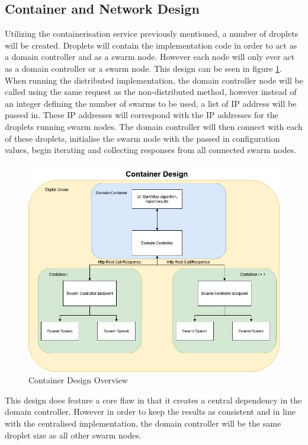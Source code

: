 \documentclass[oneside,12pt]{book}
\begin{document}
\subsection{Container and Network Design}
Utilizing the containerisation service previously mentioned, a number of droplets will be created. Droplets will contain the implementation code in order to act as a domain controller and as a swarm node. However each node will only ever act as a domain controller or a swarm node. This design can be seen in figure \ref{fig:ContainerDesignOverview}. When running the distributed implementation, the domain controller node will be called using the same request as the non-distributed method, however instead of an integer defining the number of swarms to be used, a list of IP address will be passed in. These IP addresses will correspond with the IP addresses for the droplets running swarm nodes. The domain controller will then connect with each of these droplets, initialise the swarm node with the passed in configuration values, begin iterating and collecting responses from all connected swarm nodes.

\begin{figure}[H]
    \centering
    \includegraphics[scale=0.4]{Images/ContainerDesign.png}
    \caption{Container Design Overview}
    \label{fig:ContainerDesignOverview}
\end{figure}

This design does feature a core flaw in that it creates a central dependency in the domain controller. However in order to keep the results as consistent and in line with the centralised implementation, the domain controller will be the same droplet size as all other swarm nodes. 
\end{document}
